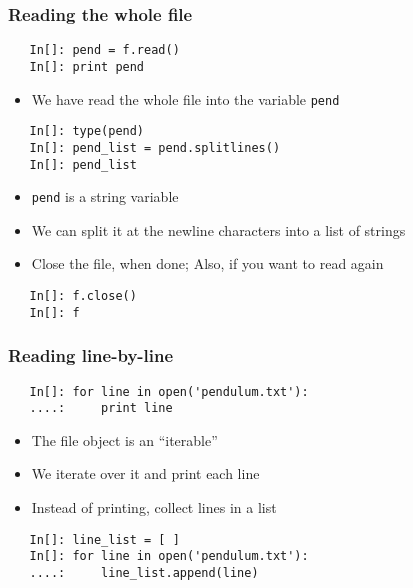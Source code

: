 \begin{frame}[fragile]
  \frametitle{Reading the whole file}
  \begin{lstlisting}
   In[]: pend = f.read()
   In[]: print pend
  \end{lstlisting}
  \begin{itemize}
  \item We have read the whole file into the variable \texttt{pend}
  \end{itemize}
  \begin{lstlisting}
   In[]: type(pend)
   In[]: pend_list = pend.splitlines()
   In[]: pend_list
  \end{lstlisting}
  \begin{itemize}
  \item  \texttt{pend} is a string variable
  \item We can split it at the newline characters into a list of
    strings
  \item Close the file, when done; Also, if you want to read again
  \end{itemize}
  \begin{lstlisting}
   In[]: f.close()
   In[]: f
  \end{lstlisting}
\end{frame}

\begin{frame}[fragile]
  \frametitle{Reading line-by-line}
  \begin{lstlisting}
   In[]: for line in open('pendulum.txt'):
   ....:     print line
  \end{lstlisting}
  \begin{itemize}
  \item The file object is an ``iterable''
  \item We iterate over it and print each line
  \item Instead of printing, collect lines in a list
  \end{itemize}
  \begin{lstlisting}
   In[]: line_list = [ ]
   In[]: for line in open('pendulum.txt'):
   ....:     line_list.append(line)
  \end{lstlisting}
\end{frame}


